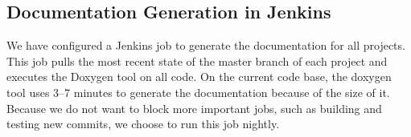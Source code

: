 \subsection{Documentation Generation in Jenkins}
We have configured a Jenkins job to generate the documentation for all projects. This job pulls the most recent state of the master branch of each project and executes the Doxygen tool on all code. On the current code base, the doxygen tool uses 3--7 minutes to generate the documentation because of the size of it. Because we do not want to block more important jobs, such as building and testing new commits, we choose to run this job nightly.

